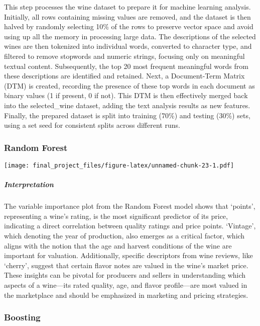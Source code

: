 \documentclass[
]{article}
\begin{document}
This step processes the wine dataset to prepare it for machine learning
analysis. Initially, all rows containing missing values are removed, and
the dataset is then halved by randomly selecting 10\% of the rows to
preserve vector space and avoid using up all the memory in processing
large data. The descriptions of the selected wines are then tokenized
into individual words, converted to character type, and filtered to
remove stopwords and numeric strings, focusing only on meaningful
textual content. Subsequently, the top 20 most frequent meaningful words
from these descriptions are identified and retained. Next, a
Document-Term Matrix (DTM) is created, recording the presence of these
top words in each document as binary values (1 if present, 0 if not).
This DTM is then effectively merged back into the selected\_wine
dataset, adding the text analysis results as new features. Finally, the
prepared dataset is split into training (70\%) and testing (30\%) sets,
using a set seed for consistent splits across different runs.

\hypertarget{random-forest}{%
\subsubsection{Random Forest}\label{random-forest}}

\texttt{[image: final\_project\_files/figure-latex/unnamed-chunk-23-1.pdf]}

\hypertarget{interpretation}{%
\subparagraph{Interpretation}\label{interpretation}}

The variable importance plot from the Random Forest model shows that
`points', representing a wine's rating, is the most significant
predictor of its price, indicating a direct correlation between quality
ratings and price points. `Vintage', which denoting the year of
production, also emerges as a critical factor, which aligns with the
notion that the age and harvest conditions of the wine are important for
valuation. Additionally, specific descriptors from wine reviews, like
`cherry', suggest that certain flavor notes are valued in the wine's
market price. These insights can be pivotal for producers and sellers in
understanding which aspects of a wine---its rated quality, age, and
flavor profile---are most valued in the marketplace and should be
emphasized in marketing and pricing strategies.

\hypertarget{boosting}{%
\subsubsection{Boosting}\label{boosting}}
\end{document}
